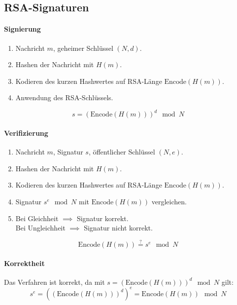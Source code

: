 		\subsection{RSA-Signaturen}
			\paragraph{Signierung}
				\begin{enumerate}
					\item[] Nachricht \(m\), geheimer Schlüssel \((N, d)\).
					\item Hashen der Nachricht mit \(H(m)\).
					\item Kodieren des kurzen Hashwertes auf RSA-Länge \(\text{Encode}(H(m))\).
					\item Anwendung des RSA-Schlüssels.
				\end{enumerate}
				\begin{equation*}
					s = (\text{Encode}(H(m))) ^ d \mod N
				\end{equation*}

			\paragraph{Verifizierung}
				\begin{enumerate}
					\item[] Nachricht \(m\), Signatur \(s\), öffentlicher Schlüssel \((N, e)\).
					\item Hashen der Nachricht mit \(H(m)\).
					\item Kodieren des kurzen Hashwertes auf RSA-Länge \(\text{Encode}(H(m))\).
					\item Signatur \( s^e \mod N \) mit \(\text{Encode}(H(m))\) vergleichen.
					\item Bei Gleichheit \(\implies\) Signatur korrekt. \\
						Bei Ungleichheit \(\implies\) Signatur nicht korrekt.
				\end{enumerate}
				\begin{equation*}
					\text{Encode}(H(m)) \overset{?}{=} s ^ e \mod N
				\end{equation*}

			\paragraph{Korrektheit}
				Das Verfahren ist korrekt, da mit \( s = (\text{Encode}(H(m))) ^ d \mod N \) gilt:
				\begin{equation*}
					s^e = ((\text{Encode}(H(m))) ^ d) ^ e = \text{Encode}(H(m)) \mod N
				\end{equation*}

